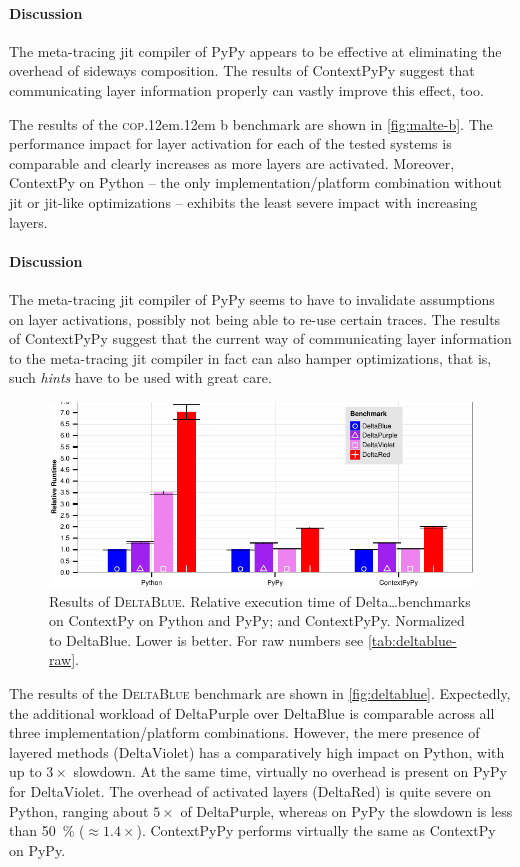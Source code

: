 \documentclass[preprint,english,10pt,nonatbib]{sigplanconf}
\DeclareRobustCommand*\copb{\textsc{cop}\kern .12em\oldstylenums{09}\kern .12em b\xspace}
\DeclareRobustCommand*\deltablue{\textsc{DeltaBlue}\xspace}
\begin{document}
\paragraph{Discussion} The meta-tracing \ac{jit} compiler of PyPy appears to be
effective at eliminating the overhead of sideways composition. The results of
ContextPyPy suggest that communicating layer information properly can vastly
improve this effect, too.
%

\medskip\noindent %
The results of the \copb benchmark are shown in \autoref{fig:malte-b}. The
performance impact for layer activation for each of the tested systems is
comparable and clearly increases as more layers are activated. Moreover,
ContextPy on Python \--- the only implementation/platform combination without
\ac{jit} or \ac{jit}-like optimizations \--- exhibits the least severe impact
with increasing layers.

\paragraph{Discussion} The meta-tracing \ac{jit} compiler of PyPy seems to have
to invalidate assumptions on layer activations, possibly not being able to
re-use certain traces. The results of ContextPyPy suggest that the current way
of communicating layer information to the meta-tracing \ac{jit} compiler in
fact can also hamper optimizations, that is, such \emph{hints} have to
be used with great care.

\begin{figure}
  \centering
  \includegraphics[width=.55\linewidth]{bench/DeltaBlue-norm.pdf}
  \caption{Results of \deltablue. Relative execution time of Delta\ldots benchmarks
    on ContextPy on Python and PyPy; and ContextPyPy. Normalized to DeltaBlue.
    Lower is better. For raw numbers see \autoref{tab:deltablue-raw}.}
  \label{fig:deltablue}
\end{figure}

\medskip\noindent %
The results of the \deltablue benchmark are shown in \autoref{fig:deltablue}.
Expectedly, the additional workload of DeltaPurple over DeltaBlue is comparable
across all three implementation/platform combinations. However, the mere
presence of layered methods (DeltaViolet) has a comparatively high impact on
Python, with up to \(3\times\)
slowdown. At the same time, virtually no overhead is present on PyPy for
DeltaViolet. The overhead of activated layers (DeltaRed) is quite severe on
Python, ranging about \(5\times\)
of DeltaPurple, whereas on PyPy the slowdown is less than \SI{50}{\percent}
(\(\approx 1.4\times\)). ContextPyPy performs virtually the same as ContextPy
on PyPy.
\end{document}

